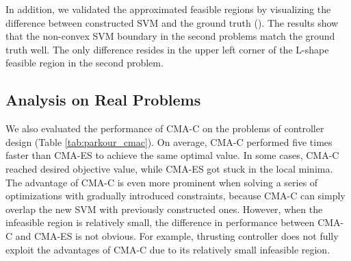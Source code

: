 In addition, we validated the approximated feasible regions by
visualizing the difference between constructed SVM and the ground
truth (). The results show that the non-convex SVM boundary in
the second problems match the ground truth well. The only difference resides
in the upper left corner of the L-shape feasible region in the second
problem. 


\subsection{Analysis on Real Problems}
We also evaluated the performance of CMA-C on the problems of
controller design (Table \ref{tab:parkour_cmac}). On average, CMA-C performed
five times faster than CMA-ES to achieve the same optimal value. In
some cases, CMA-C reached desired objective value, while CMA-ES got
stuck in the local minima. The advantage of CMA-C is even more
prominent when solving a series of optimizations with gradually
introduced constraints, because CMA-C can simply overlap the new SVM
with previously constructed ones. However, when the infeasible region
is relatively small, the difference in performance between CMA-C and
CMA-ES is not obvious. For example, thrusting controller does not
fully exploit the advantages of CMA-C due to its relatively small
infeasible region.


